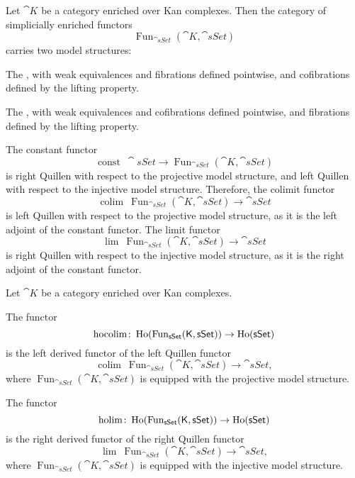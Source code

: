 Let $\cat K$ be a category enriched over Kan complexes.
Then the category of simplicially enriched functors
\[ \operatorname{Fun}_{\cat{sSet}}(\cat K,\cat{sSet}) \]
carries two model structures:
\begin{itms}
    \item The ,
    with weak equivalences and fibrations defined pointwise,
    and cofibrations defined by the lifting property.
    \item The ,
    with weak equivalences and cofibrations defined pointwise,
    and fibrations defined by the lifting property.
\end{itms}
The constant functor
\[ \operatorname{const}\:\cat{sSet}\to\operatorname{Fun}_{\cat{sSet}}(\cat K,\cat{sSet}) \]
is right Quillen with respect to the projective model structure,
and left Quillen with respect to the injective model structure.
Therefore, the colimit functor 
\[ \operatorname{colim}\:\operatorname{Fun}_{\cat{sSet}}(\cat K,\cat{sSet})\to\cat{sSet} \]
is left Quillen with respect to the projective model structure,
as it is the left adjoint of the constant functor.
The limit functor 
\[ \operatorname{lim}\:\operatorname{Fun}_{\cat{sSet}}(\cat K,\cat{sSet})\to\cat{sSet} \]
is right Quillen with respect to the injective model structure,
as it is the right adjoint of the constant functor.

\begin{definition}
    Let $\cat K$ be a category enriched over Kan complexes.
    \begin{itms}
        \item The  functor
        \[ \operatorname{hocolim}\colon\operatorname{Ho}(\operatorname{Fun}_{\mathsf{sSet}}(\mathsf{K},\mathsf{sSet}))\to\operatorname{Ho}(\mathsf{sSet}) \]
        is the left derived functor of the left Quillen functor 
        \[ \operatorname{colim}\:\operatorname{Fun}_{\cat{sSet}}(\cat K,\cat{sSet})\to\cat{sSet}, \]
        where $\operatorname{Fun}_{\cat{sSet}}(\cat K,\cat{sSet})$
        is equipped with the projective model structure.

        \item The  functor
        \[ \operatorname{holim}\colon\operatorname{Ho}(\operatorname{Fun}_{\mathsf{sSet}}(\mathsf{K},\mathsf{sSet}))\to\operatorname{Ho}(\mathsf{sSet}) \]
        is the right derived functor of the right Quillen functor 
        \[ \operatorname{lim}\:\operatorname{Fun}_{\cat{sSet}}(\cat K,\cat{sSet})\to\cat{sSet}, \]
        where $\operatorname{Fun}_{\cat{sSet}}(\cat K,\cat{sSet})$
        is equipped with the injective model structure.
    \end{itms}
\end{definition}

